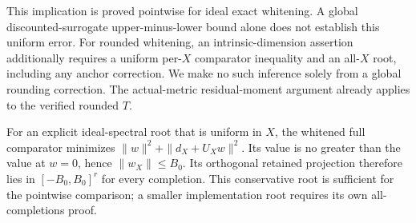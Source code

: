 This implication is proved pointwise for ideal exact whitening. A global discounted-surrogate upper-minus-lower bound alone does not establish this uniform error. For rounded whitening, an intrinsic-dimension assertion additionally requires a uniform per-$X$ comparator inequality and an all-$X$ root, including any anchor correction. We make no such inference solely from a global rounding correction. The actual-metric residual-moment argument already applies to the verified rounded $T$.


For an explicit ideal-spectral root that is uniform in $X$, the whitened full comparator minimizes $\|w\|^2+\|d_X+U_Xw\|^2$. Its value is no greater than the value at $w=0$, hence $\|w_X\|\leq B_0$. Its orthogonal retained projection therefore lies in $[-B_0,B_0]^r$ for every completion. This conservative root is sufficient for the pointwise comparison; a smaller implementation root requires its own all-completions proof.
